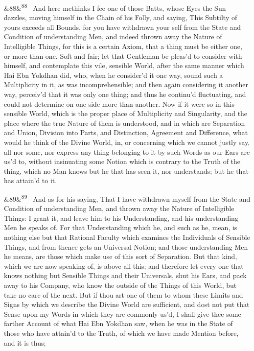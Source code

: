 \documentclass[12pt]{article}
\newcommand{\para}[1][]{\par\noindent\ifx&#1&\else\textsuperscript{\footnotesize #1}~\fi}
\begin{document}
\para[88] And here methinks I fee one of those Batts, whose Eyes the Sun dazzles, moving himself in the Chain of his Folly, and saying, This Subtilty of yours exceeds all Bounds, for you have withdrawn your self from the State and Condition of understanding Men, and indeed thrown away the Nature of Intelligible Things, for this is a certain Axiom, that a thing must be either one, or more than one. Soft and fair; let that Gentleman be pleas'd to consider with himself, and contemplate this vile, sensible World, after the same manner which Hai Ebn Yokdhan did, who, when he consider'd it one way, sound such a Multiplicity in it, as was incomprehensible; and then again considering it another way, perceiv'd that it was only one thing; and thus he continu'd fluctuating, and could not determine on one side more than another. Now if it were so in this sensible World, which is the proper place of Multiplicity and Singularity, and the place where the true Nature of them is understood, and in which are Separation and Union, Division into Parts, and Distinction, Agreement and Difference, what would he think of the Divine World, in, or concerning which we cannot justly say, all nor some, nor express any thing belonging to it by such Words as our Ears are us'd to, without insinuating some Notion which is contrary to the Truth of the thing, which no Man knows but he that has seen it, nor understands; but he that has attain'd to it.

\para[89] And as for his saying, That I have withdrawn myself from the State and Condition of understanding Men, and thrown away the Nature of Intelligible Things: I grant it, and leave him to his Understanding, and his understanding Men he speaks of. For that Understanding which he, and such as he, mean, is nothing else but that Rational Faculty which examines the Individuals of Sensible Things, and from thence gets an Universal Notion; and those understanding Men he means, are those which make use of this sort of Separation. But that kind, which we are now speaking of, is above all this; and therefore let every one that knows nothing but Sensible Things and their Universals, shut his Ears, and pack away to his Company, who know the outside of the Things of this World, but take no care of the next. But if thou art one of them to whom these Limits and Signs by which we describe the Divine World are sufficient, and dost not put that Sense upon my Words in which they are commonly us'd, I shall give thee some farther Account of what Hai Ebn Yokdhan saw, when he was in the State of those who have attain'd to the Truth, of which we have made Mention before, and it is thus;
\end{document}
